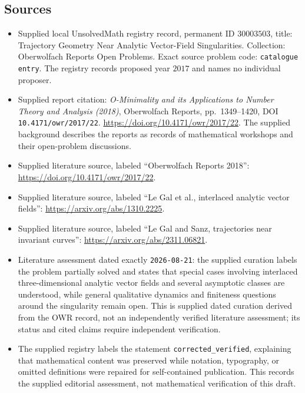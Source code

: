 \documentclass[11pt]{article}
\begin{document}
\subsection{Sources}
\begin{itemize}
\item Supplied local UnsolvedMath registry record, permanent ID \(30003503\), title: Trajectory Geometry Near Analytic Vector-Field Singularities. Collection: Oberwolfach Reports Open Problems. Exact source problem code: \texttt{catalogue entry}. The registry records proposed year \(2017\) and names no individual proposer.
\item Supplied report citation: \emph{O-Minimality and its Applications to Number Theory and Analysis (2018)}, Oberwolfach Reports, pp.\ 1349--1420, DOI \texttt{10.4171/owr/2017/22}. \url{https://doi.org/10.4171/owr/2017/22}. The supplied background describes the reports as records of mathematical workshops and their open-problem discussions.
\item Supplied literature source, labeled ``Oberwolfach Reports 2018'': \url{https://doi.org/10.4171/owr/2017/22}.
\item Supplied literature source, labeled ``Le Gal et al., interlaced analytic vector fields'': \url{https://arxiv.org/abs/1310.2225}.
\item Supplied literature source, labeled ``Le Gal and Sanz, trajectories near invariant curves'': \url{https://arxiv.org/abs/2311.06821}.
\item Literature assessment dated exactly \texttt{2026-08-21}: the supplied curation labels the problem partially solved and states that special cases involving interlaced three-dimensional analytic vector fields and several asymptotic classes are understood, while general qualitative dynamics and finiteness questions around the singularity remain open. This is supplied dated curation derived from the OWR record, not an independently verified literature assessment; its status and cited claims require independent verification.
\item The supplied registry labels the statement \texttt{corrected\_verified}, explaining that mathematical content was preserved while notation, typography, or omitted definitions were repaired for self-contained publication. This records the supplied editorial assessment, not mathematical verification of this draft.
\end{itemize}
\end{document}
